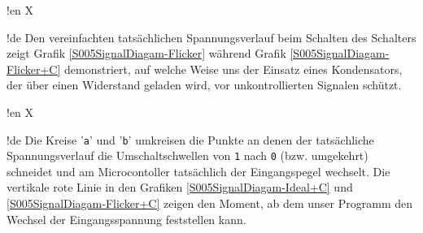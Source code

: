 !en X

!de Den vereinfachten tatsächlichen Spannungsverlauf beim Schalten des Schalters zeigt Grafik \ref{S005SignalDiagam-Flicker} während Grafik \ref{S005SignalDiagam-Flicker+C} demonstriert, auf welche Weise uns der Einsatz eines Kondensators, der über einen Widerstand geladen wird, vor unkontrollierten Signalen schützt.




!en X

!de Die Kreise '\texttt{a}' und '\texttt{b}' umkreisen die Punkte an denen der tatsächliche Spannungsverlauf die Umschaltschwellen von \texttt{1} nach \texttt{0} (bzw. umgekehrt) schneidet und am Microcontoller tatsächlich der Eingangspegel wechselt. Die vertikale rote Linie in den Grafiken \ref{S005SignalDiagam-Ideal+C} und \ref{S005SignalDiagam-Flicker+C} zeigen den Moment, ab dem unser Programm den Wechsel der Eingangsspannung feststellen kann.



